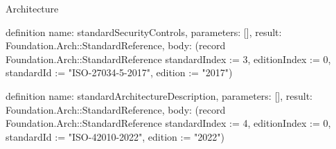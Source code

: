 \begin{lexlean}{Architecture}
\begin{semanticmodule}
definition{
  name: standardSecurityControls,
  parameters: [],
  result: Foundation.Arch::StandardReference,
  body: (record Foundation.Arch::StandardReference {standardIndex := 3, editionIndex := 0, standardId := "ISO-27034-5-2017", edition := "2017"})
}

definition{
  name: standardArchitectureDescription,
  parameters: [],
  result: Foundation.Arch::StandardReference,
  body: (record Foundation.Arch::StandardReference {standardIndex := 4, editionIndex := 0, standardId := "ISO-42010-2022", edition := "2022"})
}
\end{semanticmodule}
\end{lexlean}
